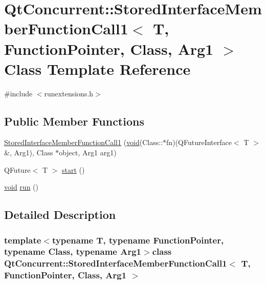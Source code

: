\hypertarget{class_qt_concurrent_1_1_stored_interface_member_function_call1}{\section{\-Qt\-Concurrent\-:\-:\-Stored\-Interface\-Member\-Function\-Call1$<$ \-T, \-Function\-Pointer, \-Class, \-Arg1 $>$ \-Class \-Template \-Reference}
\label{class_qt_concurrent_1_1_stored_interface_member_function_call1}
}


{\ttfamily \#include $<$runextensions.\-h$>$}

\subsection*{\-Public \-Member \-Functions}
\begin{DoxyCompactItemize}
\item 
\hyperlink{class_qt_concurrent_1_1_stored_interface_member_function_call1_a4438945467c7b0c8f914210c2427f706}{\-Stored\-Interface\-Member\-Function\-Call1} (\hyperlink{group___u_a_v_objects_plugin_ga444cf2ff3f0ecbe028adce838d373f5c}{void}(\-Class\-::$\ast$fn)(\-Q\-Future\-Interface$<$ \-T $>$ \&, \-Arg1), \-Class $\ast$object, \-Arg1 arg1)
\item 
\-Q\-Future$<$ \-T $>$ \hyperlink{class_qt_concurrent_1_1_stored_interface_member_function_call1_aa08de118bb8d8745a897be4aeaa11778}{start} ()
\item 
\hyperlink{group___u_a_v_objects_plugin_ga444cf2ff3f0ecbe028adce838d373f5c}{void} \hyperlink{class_qt_concurrent_1_1_stored_interface_member_function_call1_aef8620acb1f20dfe89e4378cdc654871}{run} ()
\end{DoxyCompactItemize}


\subsection{\-Detailed \-Description}
\subsubsection*{template$<$typename T, typename Function\-Pointer, typename Class, typename Arg1$>$class Qt\-Concurrent\-::\-Stored\-Interface\-Member\-Function\-Call1$<$ T, Function\-Pointer, Class, Arg1 $>$}



